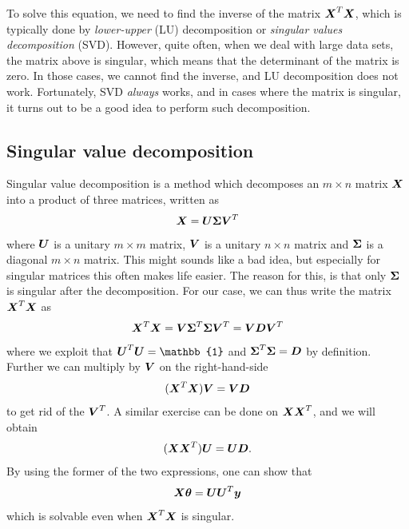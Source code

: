 To solve this equation, we need to find the inverse of the matrix $\boldsymbol{{X}}^T\boldsymbol{{X}}$, which is typically done by \textit{lower-upper} (LU) decomposition or \textit{singular values decomposition} (SVD). However, quite often, when we deal with large data sets, the matrix above is singular, which means that the determinant of the matrix is zero. In those cases, we cannot find the inverse, and LU decomposition does not work. Fortunately, SVD \textit{always} works, and in cases where the matrix is singular, it turns out to be a good idea to perform such decomposition.

\subsection{Singular value decomposition}
Singular value decomposition is a method which decomposes an $m\times n$ matrix $\boldsymbol{{X}}$ into a product of three matrices, written as
\begin{equation}
\boldsymbol{{X}}=\boldsymbol{{U}}\boldsymbol{{\Sigma}}\boldsymbol{{V}}^T
\end{equation}
where $\boldsymbol{{U}}$ is a unitary $m\times m$ matrix, $\boldsymbol{{V}}$ is a unitary $n\times n$ matrix and $\boldsymbol{{\Sigma}}$ is a diagonal $m\times n$ matrix. This might sounds like a bad idea, but especially for singular matrices this often makes life easier. The reason for this, is that only $\boldsymbol{{\Sigma}}$ is singular after the decomposition. For our case, we can thus write the matrix $\boldsymbol{{X}}^T\boldsymbol{{X}}$ as 
\begin{equation}
\boldsymbol{{X}}^T\boldsymbol{{X}}=\boldsymbol{{V}}\boldsymbol{{\Sigma}}^T\boldsymbol{{\Sigma}}\boldsymbol{{V}}^T=\boldsymbol{{V}}\boldsymbol{{D}}\boldsymbol{{V}}^T
\end{equation}
where we exploit that $\bs{U}^T\bs{U}=\mathbb{1}$ and $\boldsymbol{{\Sigma}}^T\boldsymbol{{\Sigma}}=\boldsymbol{{D}}$ by definition. Further we can multiply by $\boldsymbol{{V}}$ on the right-hand-side
\begin{equation}
(\boldsymbol{{X}}^T\boldsymbol{{X}})\boldsymbol{{V}}=\boldsymbol{{V}}\boldsymbol{{D}}
\end{equation}
to get rid of the $\boldsymbol{{V}}^T$. A similar exercise can be done on $\boldsymbol{{X}}\boldsymbol{{X}}^T$, and we will obtain
\begin{equation}
(\boldsymbol{{X}}\boldsymbol{{X}}^T)\boldsymbol{{U}}=\boldsymbol{{U}}\boldsymbol{{D}}.
\end{equation}
By using the former of the two expressions, one can show that
\begin{equation}
\boldsymbol{{X}}\boldsymbol{{\theta}}=\boldsymbol{{U}}\boldsymbol{{U}}^T\boldsymbol{{y}}
\end{equation}
which is solvable even when $\boldsymbol{{X}}^T\boldsymbol{{X}}$ is singular.

